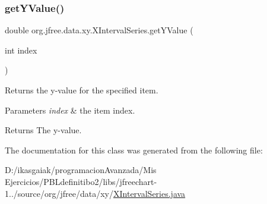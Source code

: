 \subsubsection{\texorpdfstring{get\+Y\+Value()}{getYValue()}}
{\footnotesize\ttfamily double org.\+jfree.\+data.\+xy.\+X\+Interval\+Series.\+get\+Y\+Value (\begin{DoxyParamCaption}\item[{int}]{index }\end{DoxyParamCaption})}

Returns the y-\/value for the specified item.


\begin{DoxyParams}{Parameters}
{\em index} & the item index.\\
\hline
\end{DoxyParams}
\begin{DoxyReturn}{Returns}
The y-\/value. 
\end{DoxyReturn}


The documentation for this class was generated from the following file\+:\begin{DoxyCompactItemize}
\item 
D\+:/ikasgaiak/programacion\+Avanzada/\+Mis Ejercicios/\+P\+B\+Ldefinitibo2/libs/jfreechart-\/1../source/org/jfree/data/xy/\mbox{\hyperlink{_x_interval_series_8java}{X\+Interval\+Series.\+java}}\end{DoxyCompactItemize}
